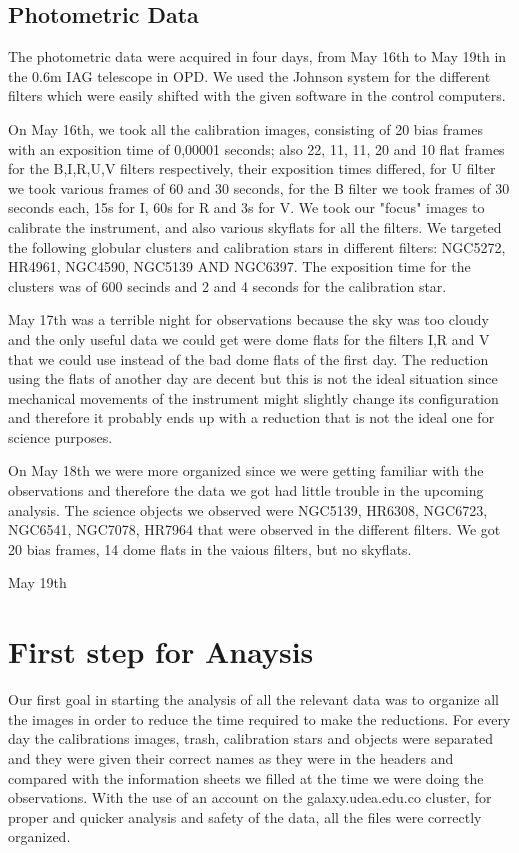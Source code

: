 \subsection{Photometric Data}

The photometric data were acquired in four days, from May 16th to May 19th in the 0.6m IAG telescope in OPD. We used the Johnson system for the different filters which were easily shifted with the given software in the control computers.  

On May 16th, we took all the calibration images, consisting of 20 bias frames with an exposition time of 0,00001 seconds; also 22, 11, 11, 20 and 10 flat frames for the B,I,R,U,V filters respectively, their exposition times differed, for  U filter we took various frames of 60 and 30 seconds, for the B filter we took frames of 30 seconds each, 15s for I, 60s for R and 3s for V. We took our "focus" images to calibrate the instrument, and also various skyflats for all the filters. We targeted the following globular clusters and calibration stars in different filters: NGC5272, HR4961, NGC4590, NGC5139 AND NGC6397. The exposition time for the clusters was of 600 secinds and 2 and 4 seconds for the calibration star. 

May 17th was a terrible night for observations because the sky was too cloudy and the only useful data we could get were dome flats for the filters I,R and V that we could use instead of the bad dome flats of the first day. The reduction using the flats of another day are decent but this is not the ideal situation since mechanical movements of the instrument might slightly change its configuration and therefore it probably ends up with a reduction that is not the ideal one for science purposes.  

On May 18th we were more organized since we were getting familiar with the observations and therefore the data we got had little trouble in the upcoming analysis. The science objects we observed were NGC5139, HR6308, NGC6723, NGC6541, NGC7078, HR7964 that were observed in the different filters. We got 20 bias frames, 14 dome flats in the vaious filters, but no skyflats.

May 19th




\section{First step for Anaysis}

Our first goal in starting the analysis of all the relevant data was to organize all the images in order to reduce the time required to make the reductions. For every day the calibrations images, trash, calibration stars and objects were separated and they were given their correct names as they were in the headers and compared with the information sheets we filled at the time we were doing the observations. With the use of an account on the galaxy.udea.edu.co cluster, for proper and quicker analysis and safety of the data, all the files were correctly organized.


